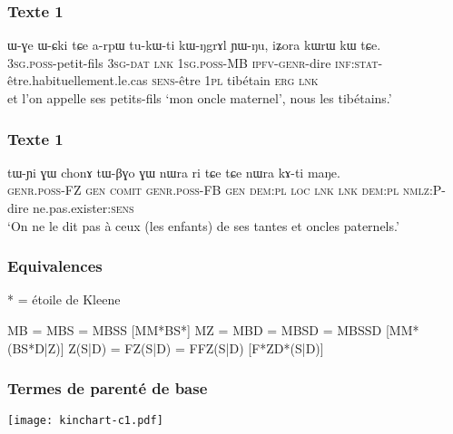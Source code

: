 \documentclass[xcolor=table]{beamer}
\newcommand{\ipa}[1]{{\phon #1}} %
\newcommand{\bleu}[1]{{\color{blue}#1}}
\newcommand{\rouge}[1]{{\color{red}#1}}
\begin{document}
  \begin{frame} 
 \frametitle{Texte 1} 
 \begin{exe}
\ex 
\gll 
\ipa{ɯ-ɣe} 	\ipa{ɯ-ɕki} 	\ipa{tɕe} 	\ipa{a-rpɯ} 	\ipa{tu-kɯ-ti} 	\ipa{kɯ-ŋgrɤl} 	\ipa{ɲɯ-ŋu,} \ipa{iʑora} 	\ipa{kɯrɯ} 	\ipa{kɯ} 	\ipa{tɕe.} \\
\textsc{3sg.poss}-petit-fils \textsc{3sg-dat} \textsc{lnk} \textsc{1sg.poss}-MB \textsc{ipfv-genr}-dire \textsc{inf:stat}-être.habituellement.le.cas \textsc{sens}-être \textsc{1pl} tibétain \textsc{erg} \textsc{lnk} \\
\glt et l'on appelle ses petits-fils `mon oncle maternel', nous les tibétains.'
\end{exe}
\end{frame}

  \begin{frame} 
 \frametitle{Texte 1} 
 \begin{exe}
\ex 
\gll 
\ipa{tɯ-ɲi} 	\ipa{ɣɯ} 	\ipa{chonɤ} 	\ipa{tɯ-βɣo} 	\ipa{ɣɯ} 	\ipa{nɯra} 	\ipa{ri} 	\ipa{tɕe} 	\ipa{tɕe} 	\ipa{nɯra} 	\ipa{kɤ-ti} 	\ipa{maŋe.} 	\\
\textsc{genr.poss}-FZ \textsc{gen} \textsc{comit} \textsc{genr.poss}-FB \textsc{gen} \textsc{dem:pl} \textsc{loc} \textsc{lnk}  \textsc{lnk}  \textsc{dem:pl} \textsc{nmlz:P}-dire  ne.pas.exister:\textsc{sens} \\
\glt `On ne le dit pas à ceux (les enfants) de ses tantes et oncles paternels.'
\end{exe}
\end{frame}

  \begin{frame} 
 \frametitle{Equivalences} 
 * = étoile de Kleene
\begin{exe}
\ex 
\glt MB = MBS = MBSS \bleu{[MM*BS*]} \rouge{\ipa{tɤ-rpɯ}}
\glt MZ = MBD = MBSD = MBSSD \bleu{[MM*(BS*D|Z)]} \rouge{\ipa{tɤ-ɬaʁ}}
\ex 
\glt Z(S|D) = FZ(S|D) = FFZ(S|D) \bleu{[F*ZD*(S|D)]} \rouge{\ipa{tɤ-ftsa}}
\end{exe}
\end{frame}

  \begin{frame} 
 \frametitle{Termes de parenté de base} 
\texttt{[image: kinchart-c1.pdf]}
\end{frame}
\end{document}
